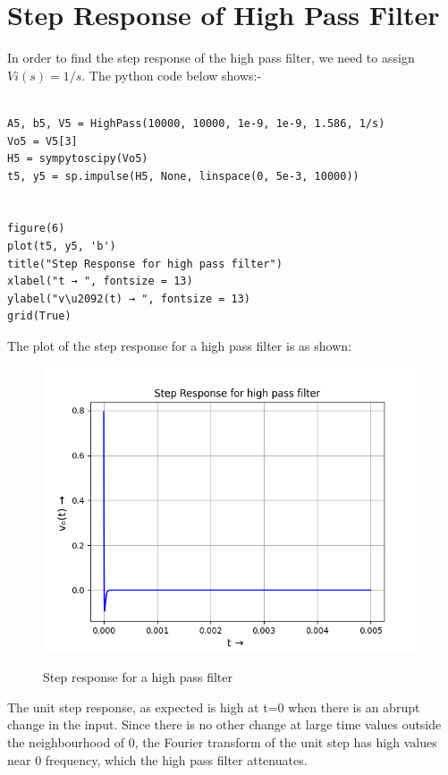 \documentclass[11pt, a4paper]{article}
\begin{document}
\section*{Step Response of High Pass Filter}
In order to find the step response of the high pass filter, we need to assign $ Vi(s) = 1/s $. 
The python code below shows:-
\begin{verbatim}
    
A5, b5, V5 = HighPass(10000, 10000, 1e-9, 1e-9, 1.586, 1/s)
Vo5 = V5[3]
H5 = sympytoscipy(Vo5)
t5, y5 = sp.impulse(H5, None, linspace(0, 5e-3, 10000))


figure(6)
plot(t5, y5, 'b')
title("Step Response for high pass filter")
xlabel("t → ", fontsize = 13)
ylabel("v\u2092(t) → ", fontsize = 13)
grid(True) 
\end{verbatim}
The plot of the step response for a high pass filter is as shown:
\begin{figure}[!tbh]
   	\centering
   	\includegraphics[width=1.0\textwidth]{Ass7_Figure_6.png}
   	\label{fig:32}
   	\caption{Step response for a high pass filter}
   \end{figure}\newpage
The unit step response, as expected is high at t=0 when there is an abrupt
change in the input. Since there is no other change at large time values outside
the neighbourhood of 0, the Fourier transform of the unit step has high values
near 0 frequency, which the high pass filter attenuates.
\end{document}
